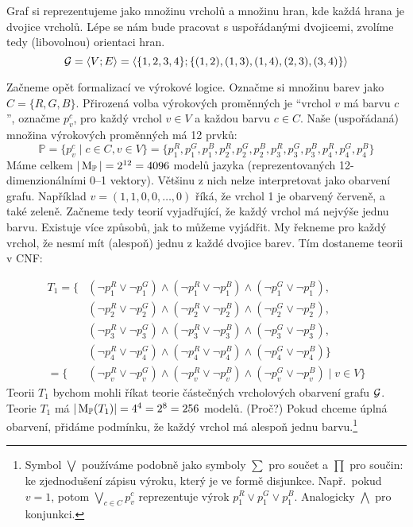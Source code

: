 Graf si reprezentujeme jako množinu vrcholů a množinu hran, kde každá hrana je dvojice vrcholů. Lépe se nám bude pracovat s uspořádanými dvojicemi, zvolíme tedy (libovolnou) orientaci hran.
\[
\mathcal{G} = \langle V; E \rangle = \langle \{1,2,3,4\}; \{(1,2),(1,3),(1,4),(2,3),(3,4)\} \rangle
\]



Začneme opět formalizací ve výrokové logice. Označme si množinu barev jako \( C=\{R,G,B\} \).  Přirozená volba výrokových proměnných je ``vrchol \(v\) má barvu \(c\)'', označme \(p_v^c\), pro každý vrchol \(v \in V\) a každou barvu \(c\in C\). Naše (uspořádaná) množina výrokových proměnných má 12 prvků:
\[
\mathbb P=\{p_v^c\mid c\in C,v\in V\}=\{p_1^R,p_1^G,p_1^B,p_2^R,p_2^G,p_2^B,p_3^R,p_3^G,p_3^B,p_4^R,p_4^G,p_4^B\}
\]
Máme celkem \( |\operatorname{M}_\mathbb P|=2^{12}=4096 \) modelů jazyka (reprezentovaných 12-dimenzionálními 0--1 vektory). Většinu z nich nelze interpretovat jako obarvení grafu. Například \( v=(1,1,0,0,\dots,0) \) říká, že vrchol 1 je obarvený červeně, a také zeleně. Začneme tedy teorií vyjadřující, že každý vrchol má nejvýše jednu barvu. Existuje více způsobů, jak to můžeme vyjádřit. My řekneme pro každý vrchol, že nesmí mít (alespoň) jednu z každé dvojice barev. Tím dostaneme teorii v {CNF}:

\begin{align*}
T_1 = \{ 
&(\neg p_1^R \lor \neg p_1^G) \land (\neg p_1^R \lor \neg p_1^B) \land (\neg p_1^G \lor \neg p_1^B),\\
&(\neg p_2^R \lor \neg p_2^G) \land (\neg p_2^R \lor \neg p_2^B) \land (\neg p_2^G \lor \neg p_2^B),\\
&(\neg p_3^R \lor \neg p_3^G) \land (\neg p_3^R \lor \neg p_3^B) \land (\neg p_3^G \lor \neg p_3^B),\\
&(\neg p_4^R \lor \neg p_4^G) \land (\neg p_4^R \lor \neg p_4^B) \land (\neg p_4^G \lor \neg p_4^B)\} \\
    = \{ &(\neg p_v^R \lor \neg p_v^G) \land (\neg p_v^R \lor \neg p_v^B) \land (\neg p_v^G \lor \neg p_v^B) \mid v \in V \} 
\end{align*}
Teorii \(T_1\) bychom mohli říkat teorie částečných vrcholových obarvení grafu \(\mathcal{G}\). Teorie \(T_1\) má \(|\operatorname{M}_\mathbb P(T_1)|= 4^4=2^8=256\) modelů. (Proč?) Pokud chceme úplná obarvení, přidáme podmínku, že každý vrchol má alespoň jednu barvu.\footnote{Symbol \(\bigvee \) používáme podobně jako symboly \(\sum \) pro součet a \(\prod \) pro součin: ke zjednodušení zápisu výroku, který je ve formě disjunkce. Např.\ pokud \(v=1\), potom \( \bigvee_{c\in C} p_v^c \) reprezentuje výrok \( p_1^R \lor p_1^G \lor p_1^B \). Analogicky \(\bigwedge \) pro konjunkci.}

